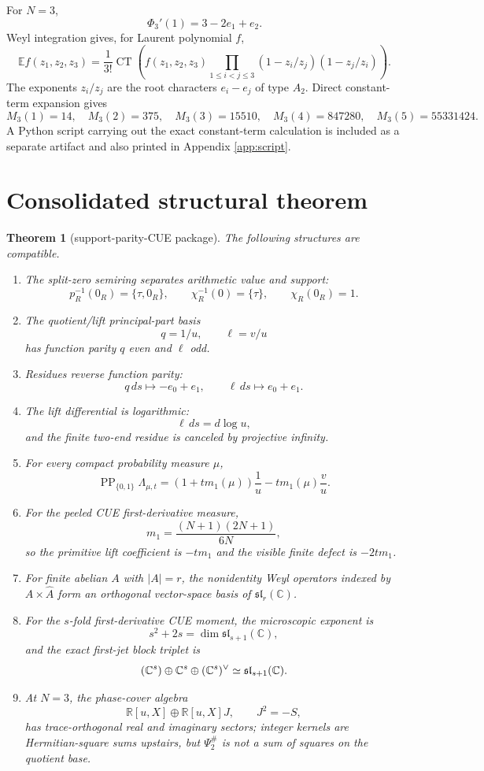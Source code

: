 \documentclass[11pt]{article}
\newtheorem{theorem}{Theorem}[section]
\let\End\relax
\DeclareMathOperator{\End}{End}
\newcommand{\C}{\mathbb C}
\newcommand{\R}{\mathbb R}
\newcommand{\PP}{\operatorname{PP}}
\newcommand{\CT}{\operatorname{CT}}
\begin{document}
For $N=3$,
\[
\Phi_3'(1)=3-2e_1+e_2.
\]
Weyl integration gives, for Laurent polynomial $f$,
\[
\mathbb E f(z_1,z_2,z_3)=\frac1{3!}\CT\left(f(z_1,z_2,z_3)
\prod_{1\le i<j\le3}(1-z_i/z_j)(1-z_j/z_i)\right).
\]
The exponents $z_i/z_j$ are the root characters $e_i-e_j$ of type $A_2$.
Direct constant-term expansion gives
\[
M_3(1)=14,
\quad
M_3(2)=375,
\quad
M_3(3)=15510,
\quad
M_3(4)=847280,
\quad
M_3(5)=55331424.
\]
A Python script carrying out the exact constant-term calculation is included as a
separate artifact and also printed in Appendix \ref{app:script}.

\section{Consolidated structural theorem}

\begin{theorem}[support-parity-CUE package]
The following structures are compatible.
\begin{enumerate}[label=(\roman*)]
\item The split-zero semiring separates arithmetic value and support:
\[
p_R^{-1}(0_R)=\{\tau,0_R\},
\qquad
\chi_R^{-1}(0)=\{\tau\},
\qquad
\chi_R(0_R)=1.
\]
\item The quotient/lift principal-part basis
\[
q=1/u,
\qquad
\ell=v/u
\]
has function parity $q$ even and $\ell$ odd.
\item Residues reverse function parity:
\[
q\,ds\mapsto -e_0+e_1,
\qquad
\ell\,ds\mapsto e_0+e_1.
\]
\item The lift differential is logarithmic:
\[
\ell\,ds=d\log u,
\]
and the finite two-end residue is canceled by projective infinity.
\item For every compact probability measure $\mu$,
\[
\PP_{\{0,1\}}\Lambda_{\mu,t}
=(1+t m_1(\mu))\frac1u-tm_1(\mu)\frac vu.
\]
\item For the peeled CUE first-derivative measure,
\[
m_1=\frac{(N+1)(2N+1)}{6N},
\]
so the primitive lift coefficient is $-tm_1$ and the visible finite defect is $-2tm_1$.
\item For finite abelian $A$ with $|A|=r$, the nonidentity Weyl operators indexed by
$A\times\widehat A$ form an orthogonal vector-space basis of
$\mathfrak{sl}_r(\C)$.
\item For the $s$-fold first-derivative CUE moment, the microscopic exponent is
\[
s^2+2s=\dim\mathfrak{sl}_{s+1}(\C),
\]
and the exact first-jet block triplet is
\[
\End(\C^s)\oplus\C^s\oplus(\C^s)^\vee\simeq\mathfrak{sl}_{s+1}(\C).
\]
\item At $N=3$, the phase-cover algebra
\[
\R[u,X]\oplus\R[u,X]J,
\qquad J^2=-S,
\]
has trace-orthogonal real and imaginary sectors; integer kernels are Hermitian-square
sums upstairs, but $\Psi_2^\#$ is not a sum of squares on the quotient base.
\end{enumerate}
\end{theorem}
\end{document}
